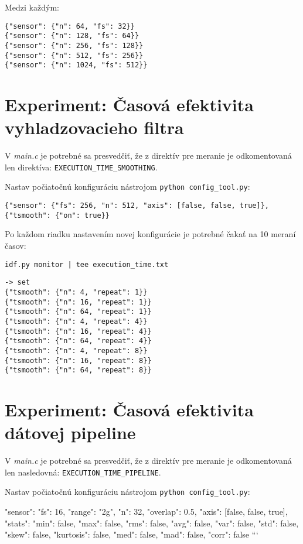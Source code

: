 Medzi každým:
\begin{lstlisting}[style=messages]
{"sensor": {"n": 64, "fs": 32}}
{"sensor": {"n": 128, "fs": 64}}
{"sensor": {"n": 256, "fs": 128}}
{"sensor": {"n": 512, "fs": 256}}
{"sensor": {"n": 1024, "fs": 512}}
\end{lstlisting}



\section{Experiment: Časová efektivita vyhladzovacieho filtra}

V \emph{main.c} je potrebné sa presvedčiť, že z direktív pre meranie je odkomentovaná len direktíva:
\verb|EXECUTION_TIME_SMOOTHING|.

Nastav počiatočnú konfiguráciu nástrojom \verb|python config_tool.py|:

\begin{lstlisting}[style=messages]
{"sensor": {"fs": 256, "n": 512, "axis": [false, false, true]},  {"tsmooth": {"on": true}}
\end{lstlisting}

Po každom riadku nastavením novej konfigurácie je potrebné čakať na 10 meraní časov:
\begin{lstlisting}[style=messages]
idf.py monitor | tee execution_time.txt
\end{lstlisting}

\begin{lstlisting}[style=messages]
-> set
{"tsmooth": {"n": 4, "repeat": 1}}
{"tsmooth": {"n": 16, "repeat": 1}}
{"tsmooth": {"n": 64, "repeat": 1}}
{"tsmooth": {"n": 4, "repeat": 4}}
{"tsmooth": {"n": 16, "repeat": 4}}
{"tsmooth": {"n": 64, "repeat": 4}}
{"tsmooth": {"n": 4, "repeat": 8}}
{"tsmooth": {"n": 16, "repeat": 8}}
{"tsmooth": {"n": 64, "repeat": 8}}
\end{lstlisting}


\section{Experiment: Časová efektivita dátovej pipeline}

V \emph{main.c} je potrebné sa presvedčiť, že z direktív pre meranie je odkomentovaná len nasledovná: 
\verb|EXECUTION_TIME_PIPELINE|.

Nastav počiatočnú konfiguráciu nástrojom \verb|python config_tool.py|:


{"sensor": {"fs": 16, "range": "2g", "n": 32, "overlap": 0.5, "axis": [false, false, true]}, "stats": {"min": false, "max": false, "rms": false, "avg": false, "var": false, "std": false, "skew": false, "kurtosis": false, "med": false, "mad": false, "corr": false}}
```

